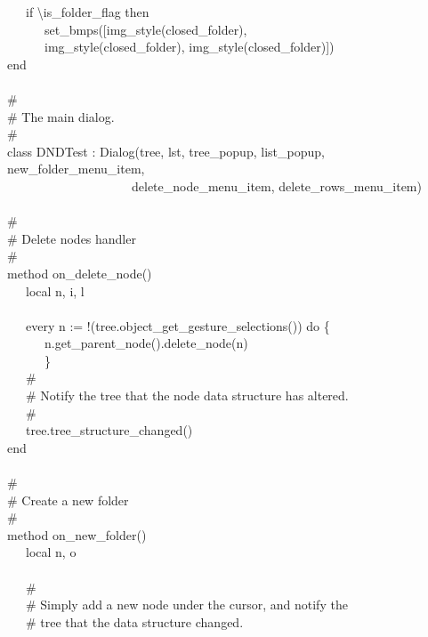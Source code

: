 {\>   \ \ \ if {\textbackslash}is\_folder\_flag then \\
\>   \ \ \ \ \ \ set\_bmps([img\_style({\textquotedbl}closed\_folder{\textquotedbl}), \\
\>   \ \ \ \ \ \ img\_style({\textquotedbl}closed\_folder{\textquotedbl}),
img\_style({\textquotedbl}closed\_folder{\textquotedbl})]) \\
end \\
\ \\
\# \\
\# The main dialog. \\
\# \\
class DNDTest : Dialog(tree, lst, tree\_popup, list\_popup, new\_folder\_menu\_item,  \\
\>   \ \ \ \ \ \ \ \ \ \ \ \ \ \ \ \ \ \ \ \ delete\_node\_menu\_item, delete\_rows\_menu\_item) \\
\ \\
\>   \# \\
\>   \# Delete nodes handler \\
\>   \# \\
\>   method on\_delete\_node() \\
\>   \ \ \ local n, i, l \\
\ \\
\>   \ \ \ every n := !(tree.object\_get\_gesture\_selections()) do \{ \\
\>   \ \ \ \ \ \ n.get\_parent\_node().delete\_node(n) \\
\>   \ \ \ \ \ \ \} \\
\>   \ \ \ \# \\
\>   \ \ \ \# Notify the tree that the node data structure has
altered. \\
\>   \ \ \ \# \\
\>   \ \ \ tree.tree\_structure\_changed() \\
\>   end \\
\ \\
\>   \# \\
\>   \# Create a new folder \\
\>   \# \\
\>   method on\_new\_folder() \\
\>   \ \ \ local n, o \\
\ \\
\>   \ \ \ \# \\
\>   \ \ \ \# Simply add a new node under the cursor, and notify the \\
\>   \ \ \ \# tree that the data structure changed. \\
}
